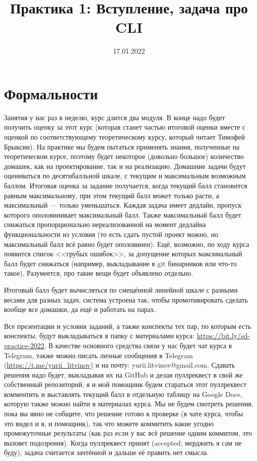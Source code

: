 \documentclass[a5paper]{article}
\title{Практика 1: Вступление, задача про CLI}
\date{17.01.2022}
\begin{document}
\maketitle
\thispagestyle{empty}

\section{Формальности}
Занятия у нас раз в неделю, курс длится два модуля. В конце надо будет получить оценку за этот курс (которая станет частью итоговой оценки вместе с оценкой по соответствующему теоретическому курсу, который читает Тимофей Брыксин). На практике мы будем пытаться применять знания, полученные на теоретическом курсе, поэтому будет некоторое (довольно большое) количество домашек, как на проектирование, так и на реализацию. Домашние задачи будут оцениваться по десятибалльной шкале, с текущим и максимальным возможным баллом. Итоговая оценка за задание получается, когда текущий балл становится равным максимальному, при этом текущий балл может только расти, а максимальный --- только уменьшаться. Каждая задача имеет дедлайн, пропуск которого ополовинивает максимальный балл. Также максимальный балл будет снижаться пропорционально нереализованной на момент дедлайна функциональности из условия (то есть сдать пустой проект можно, но максимальный балл всё равно будет ополовинен). Ещё, возможно, по ходу курса появится список <<грубых ошибок>>, за допущение которых максимальный балл будет снижаться (например, выкладывание в git бинарников или что-то такое). Разумеется, про такие вещи будет объявлено отдельно.

Итоговый балл будет вычисляться по смещённой линейной шкале с разными весами для разных задач, система устроена так, чтобы промотивировать сделать вообще все домашки, да ещё и работать на парах.

Все презентации и условия заданий, а также конспекты тех пар, по которым есть конспекты, будут выкладываться в папку с материалами курса: \url{https://bit.ly/sd-practice-2022}. В качестве основного средства связи у нас будет чат курса в Telegram, также можно писать личные сообщения в Telegram (\url{https://t.me/yurii_litvinov}) и на почту: yurii.litvinov@gmail.com. Сдавать решения надо будет, выкладывая их на GitHub и делая пуллреквест в свой же собственный репозиторий, я и мой помощник будем стараться этот пуллреквест комментить и выставлять текущий балл в отдельную таблицу на Google Docs, которую также можно найти в материалах курса. Мы не будем смотреть решения, пока вы явно не собщите, что решение готово к проверке (в чате курса, чтобы это видел и я, и помощник), так что можете коммитить какие угодно промежуточные результаты (как раз если у вас всё решение одним коммитом, это вызовет подозрения). Когда пуллреквест принят (accepted, мерджить я сам не буду), задача считается зачтённой и дальше её править нет смысла. 
\end{document}
